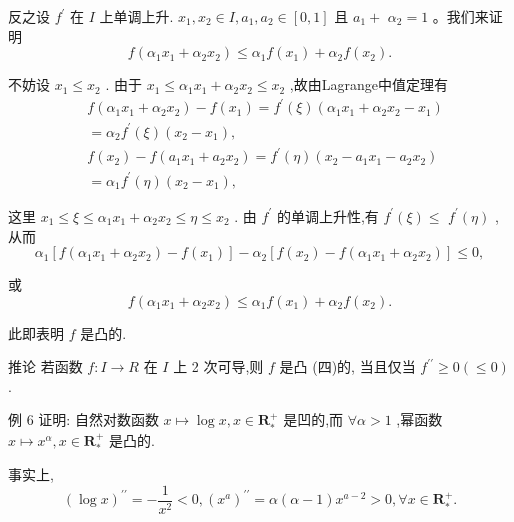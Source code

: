反之设 ${f}^{\prime }$ 在 $I$ 上单调上升. ${x}_{1},{x}_{2} \in  I,{a}_{1},{a}_{2} \in  \left\lbrack  {0,1}\right\rbrack$ 且 ${a}_{1} +$  ${\alpha }_{2} = 1$ 。我们来证明
$$f\left( {{\alpha }_{1}{x}_{1} + {\alpha }_{2}{x}_{2}}\right)  \leq  {\alpha }_{1}f\left( {x}_{1}\right)  + {\alpha }_{2}f\left( {x}_{2}\right) .$$

不妨设 ${x}_{1} \leq  {x}_{2}$ . 由于 ${x}_{1} \leq  {\alpha }_{1}{x}_{1} + {\alpha }_{2}{x}_{2} \leq  {x}_{2}$ ,故由Lagrange中值定理有
\begin{align*}
	&f\left( {{\alpha }_{1}{x}_{1} + {\alpha }_{2}{x}_{2}}\right)  - f\left( {x}_{1}\right)  = {f}^{\prime }\left( \xi \right) \left( {{\alpha }_{1}{x}_{1} + {\alpha }_{2}{x}_{2} - {x}_{1}}\right)\\
	&= {\alpha }_{2}{f}^{\prime }\left( \xi \right) \left( {{x}_{2} - {x}_{1}}\right) ,\\
	&f\left( {x}_{2}\right)  - f\left( {{a}_{1}{x}_{1} + {a}_{2}{x}_{2}}\right)  = {f}^{\prime }\left( \eta \right) \left( {{x}_{2} - {a}_{1}{x}_{1} - {a}_{2}{x}_{2}}\right)\\
	&= {\alpha }_{1}{f}^{\prime }\left( \eta \right) \left( {{x}_{2} - {x}_{1}}\right) ,
\end{align*}

这里 ${x}_{1} \leq  \xi  \leq  {\alpha }_{1}{x}_{1} + {\alpha }_{2}{x}_{2} \leq  \eta  \leq  {x}_{2}$ . 由 ${f}^{\prime }$ 的单调上升性,有 ${f}^{\prime }\left( \xi \right)  \leq$  ${f}^{\prime }\left( \eta \right)$ ,从而
$${\alpha }_{1}\left\lbrack  {f\left( {{\alpha }_{1}{x}_{1} + {\alpha }_{2}{x}_{2}}\right)  - f\left( {x}_{1}\right) }\right\rbrack   - {\alpha }_{2}\left\lbrack  {f\left( {x}_{2}\right)  - f\left( {{\alpha }_{1}{x}_{1} + {\alpha }_{2}{x}_{2}}\right) }\right\rbrack   \leq  0,$$

或
$$f\left( {{\alpha }_{1}{x}_{1} + {\alpha }_{2}{x}_{2}}\right)  \leq  {\alpha }_{1}f\left( {x}_{1}\right)  + {\alpha }_{2}f\left( {x}_{2}\right) .$$

此即表明 $f$ 是凸的.

推论 若函数 $f : I \rightarrow  R$ 在 $I$ 上 2 次可导,则 $f$ 是凸 (四)的, 当且仅当 ${f}^{\prime \prime } \geq  0\left( { \leq  0}\right)$ .

例 6 证明: 自然对数函数 $x \mapsto  \log x,x \in  {\mathbf{R}}_{ * }^{ + }$ 是凹的,而 $\forall \alpha  > 1$ ,幂函数 $x \mapsto  {x}^{\alpha },x \in  {\mathbf{R}}_{ * }^{ + }$ 是凸的.

事实上,
$${\left( \log x\right) }^{\prime \prime } =  - \frac{1}{{x}^{2}} < 0,{\left( {x}^{a}\right) }^{\prime \prime } = \alpha \left( {\alpha  - 1}\right) {x}^{a - 2} > 0,\forall x \in  {\mathbf{R}}_{ * }^{ + }.$$

